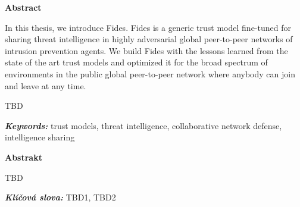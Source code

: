 \newenvironment{abstractpage}
  {\cleardoublepage\thispagestyle{empty}}
  {\vfill\cleardoublepage}
\newenvironment{abstract}[1]
  {\bigskip
   \begin{center}\bfseries#1\end{center}\small\leftskip=0.5cm\rightskip=0.5cm}
  {\par\bigskip}

\providecommand{\keywords}[2]{\footnotesize\textbf{\textit{#1:}} #2}

\begin{abstractpage}
\begin{abstract}{Abstract}

In this thesis, we introduce Fides. Fides is a generic trust model fine-tuned for sharing threat intelligence in highly adversarial global peer-to-peer networks of intrusion prevention agents.
We build Fides with the lessons learned from the state of the art trust models and optimized it for the broad spectrum of environments in the public global peer-to-peer network where anybody can join and leave at any time.



%  
TBD 
\end{abstract}

\keywords{Keywords}{trust models, threat intelligence, collaborative network defense, intelligence sharing}

\vspace*{\fill}

\begin{abstract}{Abstrakt}
    TBD 
    
\end{abstract}
\keywords{Klíčová slova}{TBD1, TBD2} 

\end{abstractpage}
\thispagestyle{empty}

\cleardoublepage